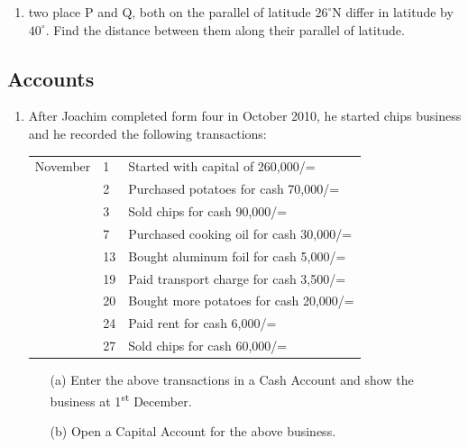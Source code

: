 \begin{enumerate}
	\item two place P and Q, both on the parallel of latitude $26^\circ$N differ in latitude by $40^\circ$. Find the distance between them along their parallel of latitude.

\end{enumerate}
	
	
	
	\subsection{Accounts}

\begin{enumerate}

	\item After Joachim completed form four in October 2010, he started chips business and he recorded the following transactions:\\
\begin{tabular}{l l l}
November & 1 &Started with capital of 260,000/=\\
& 2 & Purchased potatoes for cash 70,000/=\\
& 3 & Sold chips for cash 90,000/=\\
& 7 & Purchased cooking oil for cash 30,000/=\\
& 13 & Bought aluminum foil for cash 5,000/=\\
& 19 & Paid transport charge for cash 3,500/=\\
& 20 & Bought more potatoes for cash 20,000/=\\
& 24 & Paid rent for cash 6,000/=\\
& 27 & Sold chips for cash 60,000/=\\
\end{tabular}

	\begin{itemize}
	\item[(a)] Enter the above transactions in a Cash Account and show the business at 1\textsuperscript{st} December.
	\item[(b)] Open a Capital Account for the above business.
	\end{itemize}
	
	
	

\end{enumerate}
